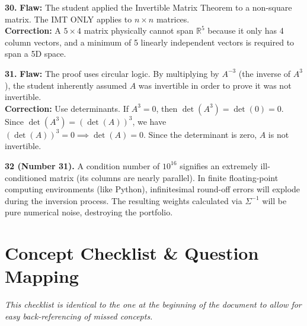 \documentclass[12pt]{article}
\begin{document}
\textbf{30.} \textbf{Flaw:} The student applied the Invertible Matrix Theorem to a non-square matrix. The IMT ONLY applies to $n \times n$ matrices. \\
\textbf{Correction:} A $5 \times 4$ matrix physically cannot span $\mathbb{R}^5$ because it only has 4 column vectors, and a minimum of 5 linearly independent vectors is required to span a 5D space.

\textbf{31.} \textbf{Flaw:} The proof uses circular logic. By multiplying by $A^{-3}$ (the inverse of $A^3$), the student inherently assumed $A$ was invertible in order to prove it was not invertible. \\
\textbf{Correction:} Use determinants. If $A^3 = 0$, then $\det(A^3) = \det(0) = 0$. Since $\det(A^3) = (\det(A))^3$, we have $(\det(A))^3 = 0 \implies \det(A) = 0$. Since the determinant is zero, $A$ is not invertible.

\textbf{32 (Number 31).} A condition number of $10^{16}$ signifies an extremely ill-conditioned matrix (its columns are nearly parallel). In finite floating-point computing environments (like Python), infinitesimal round-off errors will explode during the inversion process. The resulting weights calculated via $\Sigma^{-1}$ will be pure numerical noise, destroying the portfolio.

\newpage

\section{Concept Checklist \& Question Mapping}
\label{sec:checklist_end}
\textit{This checklist is identical to the one at the beginning of the document to allow for easy back-referencing of missed concepts.}
\end{document}
